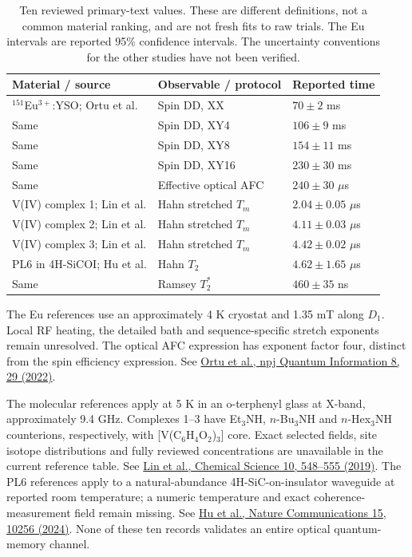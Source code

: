 \documentclass[10pt,a4paper]{article}
\begin{document}
\begin{table}[htbp]
\centering\small
\begin{tabular}{p{.35\linewidth}p{.22\linewidth}p{.28\linewidth}}
\toprule Material / source & Observable / protocol & Reported time\\\midrule
$^{151}$Eu$^{3+}$:YSO; Ortu et al. & Spin DD, XX & $70\pm2$ ms\\
Same & Spin DD, XY4 & $106\pm9$ ms\\
Same & Spin DD, XY8 & $154\pm11$ ms\\
Same & Spin DD, XY16 & $230\pm30$ ms\\
Same & Effective optical AFC & $240\pm30$ $\mu$s\\
V(IV) complex 1; Lin et al. & Hahn stretched $T_m$ & $2.04\pm0.05$ $\mu$s\\
V(IV) complex 2; Lin et al. & Hahn stretched $T_m$ & $4.11\pm0.03$ $\mu$s\\
V(IV) complex 3; Lin et al. & Hahn stretched $T_m$ & $4.42\pm0.02$ $\mu$s\\
PL6 in 4H-SiCOI; Hu et al. & Hahn $T_2$ & $4.62\pm1.65$ $\mu$s\\
Same & Ramsey $T_2^*$ & $460\pm35$ ns\\\bottomrule
\end{tabular}
\caption{Ten reviewed primary-text values. These are different definitions, not a common material ranking, and are not fresh fits to raw trials. The Eu intervals are reported 95\% confidence intervals. The uncertainty conventions for the other studies have not been verified.}
\end{table}

The Eu references use an approximately 4 K cryostat and 1.35 mT along $D_1$. Local RF heating, the detailed bath and sequence-specific stretch exponents remain unresolved. The optical AFC expression has exponent factor four, distinct from the spin efficiency expression. See \href{https://doi.org/10.1038/s41534-022-00541-3}{Ortu et al., npj Quantum Information 8, 29 (2022)}.

The molecular references apply at 5 K in an o-terphenyl glass at X-band, approximately 9.4 GHz. Complexes 1--3 have Et$_3$NH, $n$-Bu$_3$NH and $n$-Hex$_3$NH counterions, respectively, with [V(C$_6$H$_4$O$_2$)$_3$] core. Exact selected fields, site isotope distributions and fully reviewed concentrations are unavailable in the current reference table. See \href{https://doi.org/10.1039/C8SC04122A}{Lin et al., Chemical Science 10, 548--555 (2019)}. The PL6 references apply to a natural-abundance 4H-SiC-on-insulator waveguide at reported room temperature; a numeric temperature and exact coherence-measurement field remain missing. See \href{https://doi.org/10.1038/s41467-024-54606-2}{Hu et al., Nature Communications 15, 10256 (2024)}. None of these ten records validates an entire optical quantum-memory channel.
\end{document}
